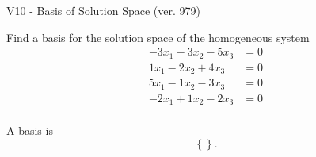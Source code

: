 \begin{exercise}
  \begin{exerciseTitle}V10 - Basis of Solution Space (ver. 979)\end{exerciseTitle}
  \begin{exerciseStatement}
    Find a basis for the solution space of the homogeneous system 
\begin{align*}
 -3 x_ 1 -3 x_ 2 -5 x_ 3 &= 0  \\ 
  1 x_ 1 -2 x_ 2 + 4 x_ 3 &= 0  \\ 
  5 x_ 1 -1 x_ 2 -3 x_ 3 &= 0  \\ 
  -2 x_ 1 + 1 x_ 2 -2 x_ 3 &= 0  \\ 
 \end{align*}


 
  \end{exerciseStatement}

  \begin{exerciseAnswer}
   A basis is   
\[\left\{\right\}.\]

  


  \end{exerciseAnswer}
\end{exercise}